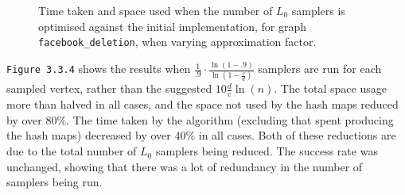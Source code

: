 \documentclass[11pt,twoside,a4paper]{report}
\begin{document}
\begin{figure}[H]
	\label{Figure 15}
	\caption{Time taken and space used when the number of $L_0$ samplers is optimised against the initial implementation, for graph \texttt{facebook\_deletion}, when varying approximation factor.}
\end{figure}
\texttt{Figure 3.3.4} shows the results when $\frac1{.9}\cdot\frac{\ln(1-.9)}{\ln(1-\frac{c}d)}$ samplers are run for each sampled vertex, rather than the suggested $10\frac{d}{c}\ln(n)$. The total space usage more than halved in all cases, and the space not used by the hash maps reduced by over $80\%$. The time taken by the algorithm (excluding that spent producing the hash maps) decreased by over $40\%$ in all cases. Both of these reductions are due to the total number of $L_0$ samplers being reduced. The success rate was unchanged, showing that there was a lot of redundancy in the number of samplers being run.
\end{document}
